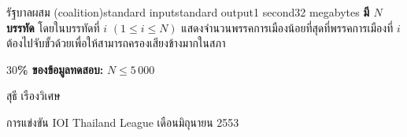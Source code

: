 \documentclass[11pt,a4paper]{article}
\begin{document}
\begin{problem}{รัฐบาลผสม (coalition)}{standard input}{standard output}{1 second}{32 megabytes}
\textbf{มี $N$ บรรทัด} โดยในบรรทัดที่ $i$ $(1 \leq i \leq N)$ แสดงจำนวนพรรคการเมืองน้อยที่สุดที่พรรคการเมืองที่ $i$ ต้องไปจับขั้วด้วยเพื่อให้สามารถครองเสียงข้างมากในสภา


\Examples

\begin{example}
%
%
\end{example}

\Scoring

\textbf{$30$\% ของข้อมูลทดสอบ:} $N \leq 5\,000$
  
\Source

สุธี เรืองวิเศษ

การแข่งขัน IOI Thailand League เดือนมิถุนายน 2553


\end{problem}
\end{document}
